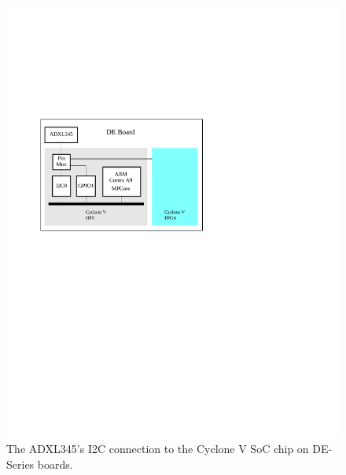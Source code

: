 \documentclass[11pt, twoside, pdftex]{article}
\begin{document}
\begin{figure} [h]
\begin{center}
\includegraphics[scale = 1.0]{figures/fig_block_diagram_hps.pdf}
\end{center}
\caption{The ADXL345's I2C connection to the Cyclone V SoC chip on DE-Series boards.}
\label{fig:fig_block_diagram}
\end{figure}

\end{document}
